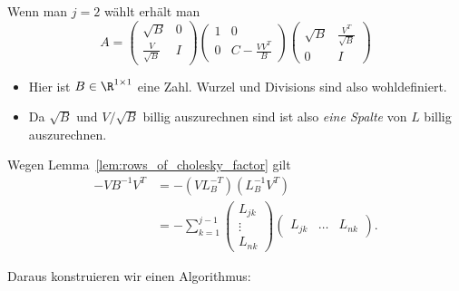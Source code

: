 Wenn man $j=2$ wählt erhält man
\begin{equation*}
  A
  =
  \begin{pmatrix}
   \sqrt{B} & 0 \\
   \frac{V}{\sqrt{B}} & I
  \end{pmatrix}
  \begin{pmatrix}
   1 & 0 \\
   0 & C-\frac{VV^T}{B}
  \end{pmatrix}
  \begin{pmatrix}
   \sqrt{B} & \frac{V^T}{\sqrt{B}} \\
   0 & I
  \end{pmatrix}
\end{equation*}
\begin{itemize}
 \item Hier ist $B \in \R^{1 \times 1}$ eine Zahl.  Wurzel und Divisions sind also
  wohldefiniert.
 \item Da $\sqrt{B}$ und $V / \sqrt{B}$ billig auszurechnen sind ist also \emph{eine Spalte}
  von $L$ billig auszurechnen.
\end{itemize}

Wegen Lemma~\ref{lem:rows_of_cholesky_factor} gilt
\begin{align*}
  -VB^{-1}V^T
  & =
  -(VL_B^{-T}) (L_B^{-1}V^T) \\
  & =-\sum_{k=1}^{j-1}
 \begin{pmatrix}
  L_{jk} \\
  \vdots \\
  L_{nk}
 \end{pmatrix}
 \begin{pmatrix}
  L_{jk} & \ldots & L_{nk}
 \end{pmatrix}.
\end{align*}

\bigskip

Daraus konstruieren wir einen Algorithmus:
\medskip

